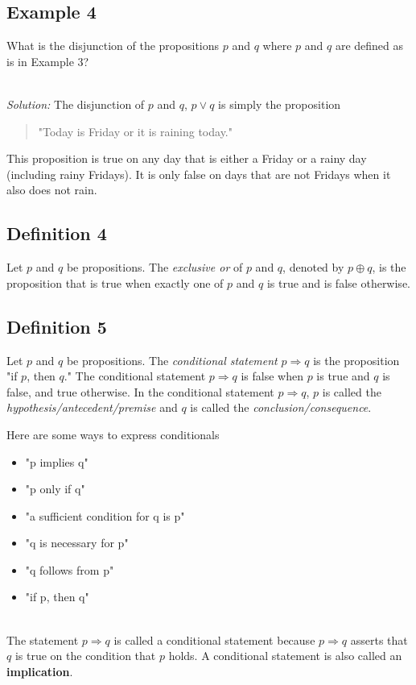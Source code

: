 \documentclass{article}
\begin{document}
\subsection*{Example 4}
What is the disjunction of the propositions $p$ and $q$ where $p$ and $q$ are defined as is in
Example 3?

\noindent \\ \textit{Solution:} The disjunction of $p$ and $q$, $p \vee q$ is simply the proposition
\begin{quote}
	"Today is Friday or it is raining today."
\end{quote}
This proposition is true on any day that is either a Friday or a rainy day (including rainy Fridays).
It is only false on days that are not Fridays when it also does not rain.
\subsection[Exclusive or]{Definition 4}
Let $p$ and $q$ be propositions. The \textit{exclusive or} of $p$ and $q$, denoted by $p \oplus q$,
is the proposition that is true when exactly one of $p$ and $q$ is true and is false otherwise.
\subsection[Conditional Statements]{Definition 5}
Let $p$ and $q$ be propositions. The \textit{conditional statement} $p \Rightarrow q$ is the proposition
"if $p$, then $q$." The conditional statement $p \Rightarrow q$ is false when $p$ is true and $q$ is false, and true
otherwise. In the conditional statement $p \Rightarrow q$, $p$ is called the \textit{hypothesis/antecedent/premise}
and $q$ is called the \textit{conclusion/consequence}.

\noindent Here are some ways to express conditionals

\begin{itemize}
	\item "p implies q"
	\item "p only if q"
	\item "a sufficient condition for q is p"
	\item "q is necessary for p"
	\item "q follows from p"
	\item "if p, then q"
\end{itemize}

\noindent \\ The statement $p \Rightarrow q$ is called a conditional statement because $p \Rightarrow q$ asserts
that $q$ is true on the condition that $p$ holds. A conditional statement is also called an \textbf{implication}.
\end{document}
